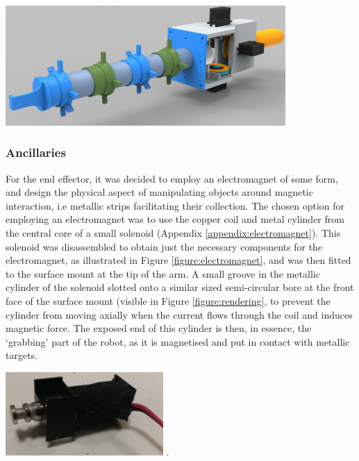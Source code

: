 \documentclass[11pt]{article}
\begin{document}
\begin{center}
\includegraphics[width=0.8\textwidth]{images/rendering.png}
\label{figure:rendering}
\end{center}

\subsubsection{Ancillaries}
For the end effector, it was decided to employ an electromagnet of some form, and design the physical aspect of manipulating objects around magnetic interaction, i.e metallic strips facilitating their collection. The chosen option for employing an electromagnet was to use the copper coil and metal cylinder from the central core of a small solenoid (Appendix \ref{appendix:electromagnet}). This solenoid was disassembled to obtain just the necessary components for the electromagnet, as illustrated in Figure \ref{figure:electromagnet}, and was then fitted to the surface mount at the tip of the arm. A small groove in the metallic cylinder of the solenoid slotted onto a similar sized semi-circular bore at the front face of the surface mount (visible in Figure \ref{figure:rendering}, to prevent the cylinder from moving axially when the current flows through the coil and induces magnetic force. The exposed end of this cylinder is then, in essence, the `grabbing' part of the robot, as it is magnetised and put in contact with metallic targets.

\begin{center}
\includegraphics[width=0.45\textwidth]{images/electromagnet.png}
.
\label{figure:electromagnet}
\end{center}
\end{document}
